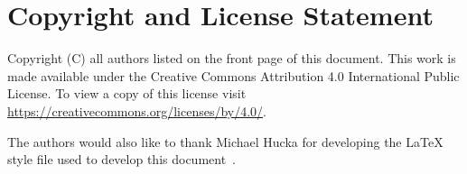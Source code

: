 \section{Copyright and License Statement}


Copyright (C) all authors listed on the front page of this document.
This work is made available under the Creative Commons Attribution 4.0 International Public License. To view a copy of this license visit\\
\href{https://creativecommons.org/licenses/by/4.0/}{https://creativecommons.org/licenses/by/4.0/}.

The authors would also like to thank Michael Hucka for developing the LaTeX style file used to develop this document~\citep{hucka2017sbmlpkgspec}.
